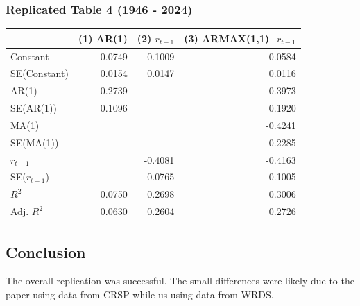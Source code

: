 \documentclass[11pt]{article}
\begin{document}
\subsubsection{Replicated Table 4 (1946 -
2024)}\label{replicated-table-4-1946---2024}

{\def\LTcaptype{none} %
\begin{longtable}[]{@{}lrrr@{}}
\toprule\noalign{}
& (1) AR(1) & (2) \(r_{t-1}\) & (3) ARMAX(1,1)\(+r_{t-1}\) \\
\midrule\noalign{}
\endhead
\bottomrule\noalign{}
\endlastfoot
Constant & 0.0749 & 0.1009 & 0.0584 \\
SE(Constant) & 0.0154 & 0.0147 & 0.0116 \\
AR(1) & -0.2739 & & 0.3973 \\
SE(AR(1)) & 0.1096 & & 0.1920 \\
MA(1) & & & -0.4241 \\
SE(MA(1)) & & & 0.2285 \\
\(r_{t-1}\) & & -0.4081 & -0.4163 \\
SE(\(r_{t-1}\)) & & 0.0765 & 0.1005 \\
\(R^2\) & 0.0750 & 0.2698 & 0.3006 \\
Adj. \(R^2\) & 0.0630 & 0.2604 & 0.2726 \\
\end{longtable}
}

    \subsection{Conclusion}\label{conclusion}

The overall replication was successful. The small differences were
likely due to the paper using data from CRSP while us using data from
WRDS.

    

    

    

    

    


    
    
    
\end{document}
